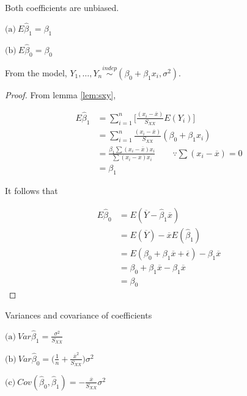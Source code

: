 \documentclass[]{book}
\theoremstyle{definition}
\theoremstyle{definition}
\theoremstyle{definition}
\theoremstyle{remark}
\let\BeginKnitrBlock\begin \let\EndKnitrBlock\end
\begin{document}
\BeginKnitrBlock{proposition}[Unbiasedness]
\protect\hypertarget{prp:ue}{}{\label{prp:ue} {} }Both coefficients are unbiased.

\(\text{(a)}\: E\hat\beta_1 = \beta_1\)

\(\text{(b)}\: E\hat\beta_0 = \beta_0\)
\EndKnitrBlock{proposition}

From the model, \(Y_1, \ldots, Y_n \stackrel{indep}{\sim} (\beta_0 + \beta_1 x_i, \sigma^2)\).

\BeginKnitrBlock{proof}
{}From lemma \ref{lem:sxy},

\begin{equation*}
  \begin{split}
    E\hat\beta_1 & = \sum_{i = 1}^n \bigg[ \frac{(x_i - \overline{x})}{S_{XX}} E(Y_i) \bigg] \\
    & = \sum_{i = 1}^n \frac{(x_i - \overline{x})}{S_{XX}}(\beta_0 + \beta_1 x_i) \\
    & = \frac{\beta_1 \sum (x_i - \overline{x})x_i}{\sum (x_i - \overline{x})x_i} \qquad \because \sum (x_i - \overline{x}) = 0 \\
    & = \beta_1
  \end{split}
\end{equation*}

It follows that

\begin{equation*}
  \begin{split}
    E\hat\beta_0 & = E(\overline{Y} - \hat\beta_1 \overline{x}) \\
    & = E(\overline{Y}) - \overline{x}E(\hat\beta_1) \\
    & = E(\beta_0 + \beta_1 \overline{x} + \overline{\epsilon}) - \beta_1 \overline{x} \\
    & = \beta_0 + \beta_1 \overline{x} - \beta_1 \overline{x} \\
    & = \beta_0
  \end{split}
\end{equation*}
\EndKnitrBlock{proof}

\BeginKnitrBlock{proposition}[Variances]
\protect\hypertarget{prp:vb}{}{\label{prp:vb} {} }Variances and covariance of coefficients

\(\text{(a)}\: Var\hat\beta_1 = \frac{\sigma^2}{S_{XX}}\)

\(\text{(b)}\: Var\hat\beta_0 = \bigg( \frac{1}{n} + \frac{\overline{x}^2}{S_{XX}} \bigg)\sigma^2\)

\(\text{(c)}\: Cov(\hat\beta_0, \hat\beta_1) = - \frac{\overline{x}}{S_{XX}} \sigma^2\)
\EndKnitrBlock{proposition}
\end{document}
